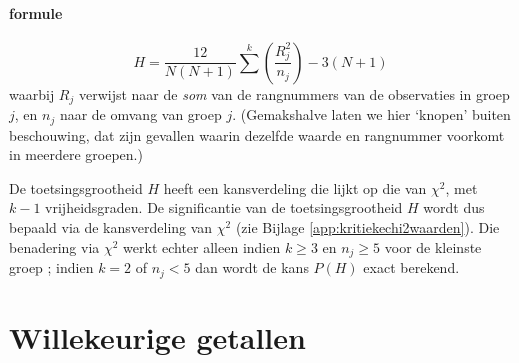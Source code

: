 \documentclass[
]{book}
\begin{document}
\hypertarget{formule-1}{%
\subsubsection{formule}\label{formule-1}}

\begin{equation}
  \label{eq:kruskall-wallis-H}
    H = \frac{12}{N(N+1)} \sum^{k} (\frac{R^2_j}{n_j}) - 3(N+1)
\end{equation}
waarbij \(R_j\) verwijst naar de \emph{som} van de rangnummers van de
observaties in groep \(j\), en \(n_j\) naar de omvang van groep \(j\).
(Gemakshalve laten we hier `knopen' buiten beschouwing, dat zijn
gevallen waarin dezelfde waarde en rangnummer voorkomt in meerdere
groepen.)

De toetsingsgrootheid \(H\) heeft een kansverdeling die lijkt op die van
\(\chi^2\), met \(k-1\) vrijheidsgraden. De significantie van de
toetsingsgrootheid \(H\) wordt dus bepaald via de kansverdeling van
\(\chi^2\) (zie Bijlage \ref{app:kritiekechi2waarden}).
Die benadering via \(\chi^2\) werkt echter alleen indien \(k\ge3\)
en \(n_j\ge5\) voor de kleinste groep \citep{Ferg89}; indien \(k=2\) of \(n_j<5\)
dan wordt de kans \(P(H)\) exact berekend.

\hypertarget{appendix-bijlagen}{%
\appendix}


\hypertarget{app:randomgetallen}{%
\chapter{Willekeurige getallen}\label{app:randomgetallen}}
\end{document}
